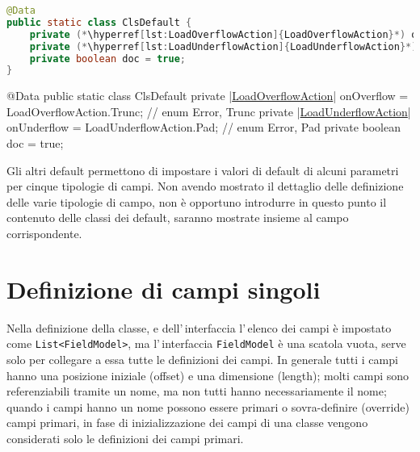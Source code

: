 \ifesource
\begin{figure*}[!htb]
\begin{lstlisting}[language=java, caption=classe ClsDefault, 
label=lst:ClsDefault]
@Data
public static class ClsDefault {
    private (*\hyperref[lst:LoadOverflowAction]{LoadOverflowAction}*) onOverflow = LoadOverflowAction.Trunc;   // enum {Error, Trunc}
    private (*\hyperref[lst:LoadUnderflowAction]{LoadUnderflowAction}*) onUnderflow = LoadUnderflowAction.Pad;  // enum {Error, Pad}
    private boolean doc = true;
}
\end{lstlisting}
\end{figure*}
\else
\begin{elisting}[!htb]
\begin{javacode}
@Data
public static class ClsDefault {
    private |\hyperref[lst:LoadOverflowAction]{LoadOverflowAction}| onOverflow = LoadOverflowAction.Trunc;   // enum {Error, Trunc}
    private |\hyperref[lst:LoadUnderflowAction]{LoadUnderflowAction}| onUnderflow = LoadUnderflowAction.Pad;  // enum {Error, Pad}
    private boolean doc = true;
}
\end{javacode}
\caption{classe ClsDefault}
\label{lst:ClsDefault}
\end{elisting}
\fi

Gli altri default permettono di impostare i valori di default di alcuni 
parametri per cinque tipologie di campi. Non avendo mostrato il dettaglio delle 
definizione delle varie tipologie di campo, non è opportuno introdurre in 
questo punto il contenuto delle classi dei default, saranno mostrate insieme al 
campo corrispondente.

\chapter{Definizione di campi singoli}
Nella definizione della classe, e dell'\,interfaccia l'\,elenco dei campi è
impostato come \verb!List<FieldModel>!, ma l'\,interfaccia \verb!FieldModel! è
una scatola vuota, serve solo per collegare a essa tutte le definizioni dei
campi. In generale tutti i campi hanno una posizione iniziale (offset) e una
dimensione (length); molti campi sono referenziabili tramite un nome, 
ma non tutti hanno necessariamente il nome; quando i campi hanno un nome
possono essere primari o sovra-definire (override) campi primari, in fase di 
inizializzazione dei campi di una classe vengono considerati solo le definizioni
dei campi primari.

